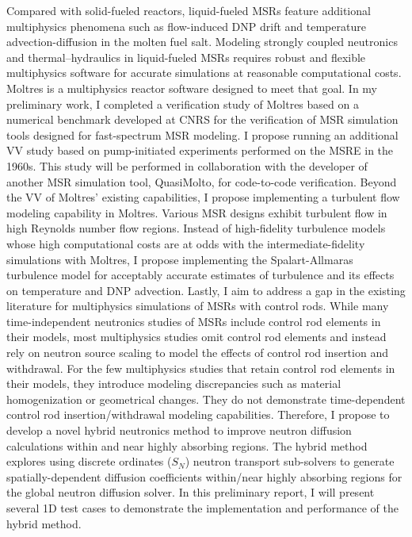 Compared with solid-fueled reactors, liquid-fueled \glspl{MSR} feature additional multiphysics
phenomena such as flow-induced DNP drift and temperature advection-diffusion in the molten fuel
salt. Modeling strongly coupled neutronics and thermal–hydraulics in
liquid-fueled \glspl{MSR} requires robust and flexible multiphysics software for accurate
simulations at reasonable computational costs. Moltres is a multiphysics reactor software designed
to meet that goal. In my preliminary work, I completed a verification study of Moltres based on a
numerical benchmark developed at \gls{CNRS} for the verification of \gls{MSR} simulation tools
designed for fast-spectrum \gls{MSR} modeling. I propose running an additional
\gls{VV} study based on pump-initiated experiments performed on the \gls{MSRE} in the 1960s.
This study will be performed in collaboration with the developer of another \gls{MSR} simulation
tool, QuasiMolto, for code-to-code verification. Beyond the \gls{VV} of Moltres’ existing
capabilities, I propose implementing a turbulent flow modeling
capability in Moltres. Various \gls{MSR} designs exhibit turbulent flow in high Reynolds number
flow regions. Instead of high-fidelity turbulence models whose high computational costs are at odds
with the intermediate-fidelity simulations with Moltres, I propose implementing the
Spalart-Allmaras turbulence model for acceptably accurate estimates of turbulence and its effects
on temperature and \gls{DNP} advection.
Lastly, I aim to address a gap in the existing literature for multiphysics simulations of MSRs with
control rods. While many time-independent neutronics studies of MSRs
include control rod elements in their models, most multiphysics studies omit control rod
elements and instead rely on neutron source scaling to model the effects of control rod insertion
and withdrawal. For the few multiphysics studies that retain control
rod elements in their models, they introduce modeling discrepancies such as material homogenization
or geometrical changes. They do not demonstrate time-dependent control rod insertion/withdrawal
modeling capabilities. Therefore, I propose to develop a novel hybrid neutronics method to improve
neutron diffusion calculations within and near highly absorbing regions. The hybrid method explores
using discrete ordinates ($S_N$) neutron transport sub-solvers to generate spatially-dependent
diffusion coefficients within/near highly absorbing regions for the global neutron diffusion
solver. In this preliminary report, I will present several 1D test cases to demonstrate the
implementation and performance of the hybrid method.
